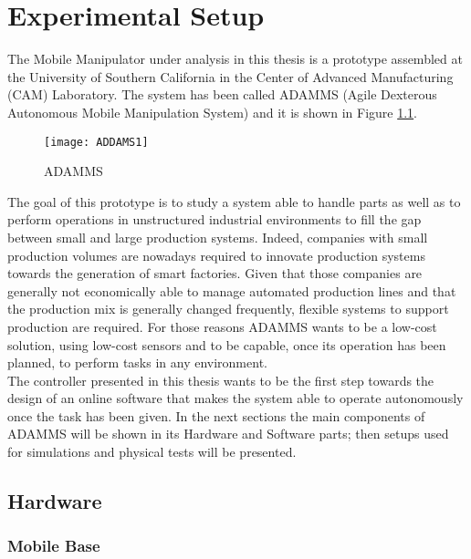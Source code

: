 
\chapter{Experimental Setup}
\label{chapter6}

The Mobile Manipulator under analysis in this thesis is a prototype assembled at the University of Southern California in the Center of Advanced Manufacturing (CAM) Laboratory. The system has been called ADAMMS (Agile  Dexterous  Autonomous  Mobile Manipulation System) and it is shown in Figure \ref{imgADDAMS1}.

\begin{figure}[h!] 
\texttt{[image: ADDAMS1]}
\centering
\caption{ADAMMS}
\label{imgADDAMS1}
\end{figure}

The goal of this prototype is to study a system able to handle parts as well as to perform operations in unstructured industrial environments to fill the gap between small and large production systems. Indeed, companies with small production volumes are nowadays required to innovate production systems towards the generation of smart factories. Given that those companies are generally not economically able to manage automated production lines and that the production mix is generally changed frequently, flexible systems to support production are required. For those reasons ADAMMS wants to be a low-cost solution, using low-cost sensors and to be capable, once its operation has been planned, to perform tasks in any environment. \\


The controller presented in this thesis wants to be the first step towards the design of an online software that makes the system able to operate autonomously once the task has been given. In the next sections the main components of ADAMMS will be shown in its Hardware and Software parts; then setups used for simulations and physical tests will be presented. 
\section{Hardware}

\subsection{Mobile Base}

